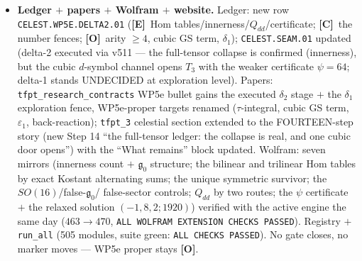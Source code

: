 \documentclass[11pt]{article}
\providecommand{\mE}{\textbf{[E]}}\providecommand{\mC}{\textbf{[C]}}
\providecommand{\mO}{\textbf{[O]}}\providecommand{\mX}{\textbf{[X]}}
\begin{document}
\begin{itemize}[leftmargin=1.5em]
holomorphic $q^0$ reading is REFUTED at the $\Z_2$/Eguchi--Hanson anchor (method boundary, not a
kill); (ii) the forced leading $(T_5,T_3)$ ratio is $4{:}3$ (sector $2$ : sectors $1{+}3$);
(iii) the $SL(2,\Z)$ orbit decomposition $15=12+3$ identifies the contact term as the MODULAR
COMPLETION of the AB data (a Harvey--Moore-type $\tau$-integral), not a free number; (iv) massive
coset levels $n\ge2$ are mandatory. The remaining $\delta_1$ target is the $\tau$-integral,
evaluated against the $\delta_2$-sharpened criterion ($\psi=64$ slice or selection-rule
relaxation).
\item \textbf{Ledger $+$ papers $+$ Wolfram $+$ website.} Ledger: new row
\texttt{CELEST.WP5E.DELTA2.01} (\mE\ Hom tables/innerness/$Q_{dd}$/certificate; \mC\ the number
fences; \mO\ arity $\ge4$, cubic GS term, $\delta_1$); \texttt{CELEST.SEAM.01} updated (delta-2
executed via v511 --- the full-tensor collapse is confirmed (innerness), but the cubic $d$-symbol
channel opens $T_3$ with the weaker certificate $\psi=64$; delta-1 stands UNDECIDED at
exploration level). Papers: \texttt{tfpt\_research\_contracts} WP5e bullet gains the executed
$\delta_2$ stage $+$ the $\delta_1$ exploration fence, WP5e-proper targets renamed
($\tau$-integral, cubic GS term, $\varepsilon_1$, back-reaction); \texttt{tfpt\_3} celestial
section extended to the FOURTEEN-step story (new Step 14 ``the full-tensor ledger: the collapse
is real, and one cubic door opens'') with the ``What remains'' block updated. Wolfram: seven
mirrors (innerness count $+$ $\mathfrak g_0$ structure; the bilinear and trilinear Hom tables by
exact Kostant alternating sums; the unique symmetric survivor; the $SO(16)$/false-$\mathfrak g_0$/
false-sector controls; $Q_{dd}$ by two routes; the $\psi$ certificate $+$ the relaxed solution
$(-1,8,2;1920)$) verified with the active engine the same day ($463\to470$,
\texttt{ALL WOLFRAM EXTENSION CHECKS PASSED}). Registry $+$ \texttt{run\_all} (505 modules, suite
green: \texttt{ALL CHECKS PASSED}). No gate closes, no marker moves --- WP5e proper stays \mO.
\end{itemize}
\end{document}
